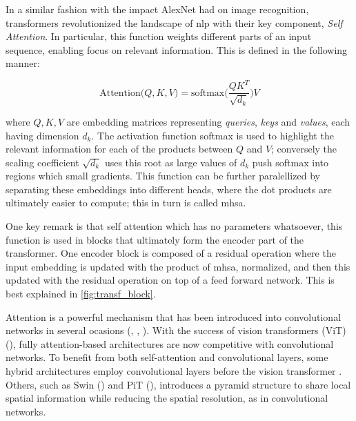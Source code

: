 In a similar fashion with the impact AlexNet had on image recognition, transformers revolutionized 
the landscape of \gls{nlp} with their key component, \emph{Self Attention}. In particular, this 
function weights different parts of an input sequence, enabling focus on relevant information. 
This is defined in the following manner:

\begin{equation}
    \mbox{Attention(}Q, K, V) = \mbox{softmax(}\frac{QK^T}{\sqrt{d_k}})V
    \label{eq:att}
\end{equation}

where $Q, K, V$ are embedding matrices representing \emph{queries}, \emph{keys} and \emph{values}, 
each having dimension $d_k$. The activation function softmax is used to highlight the relevant 
information for each of the products between $Q$ and $V$; conversely the scaling coefficient 
$\sqrt{d_k}$ uses this root as large values of $d_k$ push softmax into regions which small 
gradients. This function can be further paralellized by separating these embeddings into different 
heads, where the dot products are ultimately easier to compute; this in turn is called \gls{mhsa}.

One key remark is that self attention which has no parameters whatsoever, this function is used in 
blocks that ultimately form the encoder part of the transformer. One encoder block is composed of a 
residual  operation where the input embedding is updated with the product of \gls{mhsa}, normalized, 
and then this updated with the residual operation on top of a feed forward network. This is best 
explained in \autoref{fig:transf_block}.




Attention is a powerful mechanism that has been introduced into convolutional networks in several 
ocasions (\cite{bello2019attention}, \cite{ramachandran2019stand}, \cite{shen2020global}). 
With the success of vision transformers (ViT) (\cite{dosovitskiy2020image}), fully attention-based 
architectures are now competitive with convolutional networks. To benefit from both self-attention 
and convolutional layers, some hybrid architectures employ convolutional layers before the vision transformer 
. Others, such as Swin (\cite{liu2021swin}) and PiT 
(\cite{heo2021rethinking}), introduces a pyramid structure to share local spatial information 
while reducing the spatial resolution, as in convolutional networks. 

